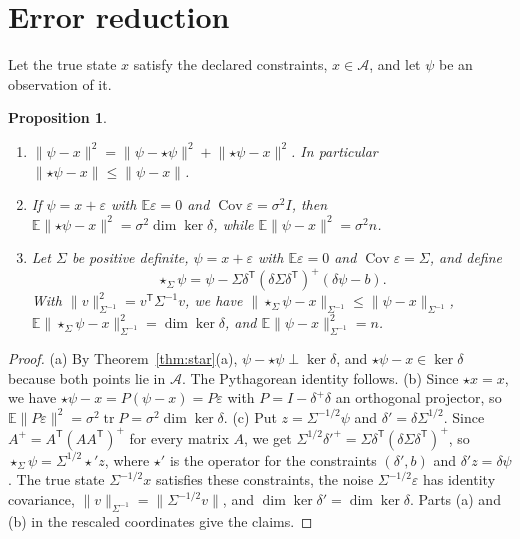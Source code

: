 \documentclass[11pt,letterpaper]{article}
\theoremstyle{plain}
\newtheorem{proposition}{Proposition}
\theoremstyle{definition}
\theoremstyle{remark}
\newcommand{\norm}[1]{\lVert #1\rVert}
\newcommand{\pinv}{^{+}}
\newcommand{\tr}{^{\mathsf T}}
\begin{document}
\section{Error reduction}\label{sec:error}

Let the true state $x$ satisfy the declared constraints, $x\in\mathcal{A}$, and let $\psi$ be an observation of it.

\begin{proposition}\label{prop:error}
\begin{enumerate}[label=(\alph*)]
\item $\norm{\psi-x}^{2}=\norm{\psi-\star\psi}^{2}+\norm{\star\psi-x}^{2}$. In particular $\norm{\star\psi-x}\le\norm{\psi-x}$.
\item If $\psi=x+\varepsilon$ with $\mathbb{E}\varepsilon=0$ and $\operatorname{Cov}\varepsilon=\sigma^{2}I$, then $\mathbb{E}\norm{\star\psi-x}^{2}=\sigma^{2}\dim\ker\delta$, while $\mathbb{E}\norm{\psi-x}^{2}=\sigma^{2}n$.
\item Let $\Sigma$ be positive definite, $\psi=x+\varepsilon$ with $\mathbb{E}\varepsilon=0$ and $\operatorname{Cov}\varepsilon=\Sigma$, and define
\[
\star_{\Sigma}\psi=\psi-\Sigma\delta\tr(\delta\Sigma\delta\tr)\pinv(\delta\psi-b).
\]
With $\norm{v}_{\Sigma^{-1}}^{2}=v\tr\Sigma^{-1}v$, we have $\norm{\star_\Sigma\psi-x}_{\Sigma^{-1}}\le\norm{\psi-x}_{\Sigma^{-1}}$, $\mathbb{E}\norm{\star_\Sigma\psi-x}_{\Sigma^{-1}}^{2}=\dim\ker\delta$, and $\mathbb{E}\norm{\psi-x}_{\Sigma^{-1}}^{2}=n$.
\end{enumerate}
\end{proposition}

\begin{proof}
(a) By Theorem~\ref{thm:star}(a), $\psi-\star\psi\perp\ker\delta$, and $\star\psi-x\in\ker\delta$ because both points lie in $\mathcal{A}$. The Pythagorean identity follows. (b) Since $\star x=x$, we have $\star\psi-x=P(\psi-x)=P\varepsilon$ with $P=I-\delta\pinv\delta$ an orthogonal projector, so $\mathbb{E}\norm{P\varepsilon}^{2}=\sigma^{2}\operatorname{tr}P=\sigma^{2}\dim\ker\delta$. (c) Put $z=\Sigma^{-1/2}\psi$ and $\delta'=\delta\Sigma^{1/2}$. Since $A\pinv=A\tr(AA\tr)\pinv$ for every matrix $A$, we get $\Sigma^{1/2}\delta'^{+}=\Sigma\delta\tr(\delta\Sigma\delta\tr)\pinv$, so $\star_\Sigma\psi=\Sigma^{1/2}\star'z$, where $\star'$ is the operator for the constraints $(\delta',b)$ and $\delta'z=\delta\psi$. The true state $\Sigma^{-1/2}x$ satisfies these constraints, the noise $\Sigma^{-1/2}\varepsilon$ has identity covariance, $\norm{v}_{\Sigma^{-1}}=\norm{\Sigma^{-1/2}v}$, and $\dim\ker\delta'=\dim\ker\delta$. Parts (a) and (b) in the rescaled coordinates give the claims. \qedhere
\end{proof}
\end{document}
